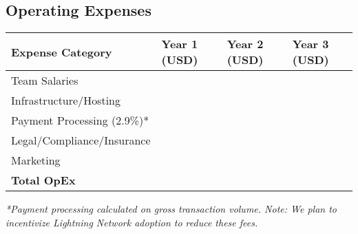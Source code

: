 \subsection{Operating Expenses}
\begin{table}[H]
\centering
\begin{tabularx}{\linewidth}{l Y Y Y}
\toprule
Expense Category & Year 1 (USD) & Year 2 (USD) & Year 3 (USD) \\\midrule
Team Salaries & \numint{\teamSalariesYearOne} & \numint{\teamSalariesYearTwo} & \numint{\teamSalariesYearThree} \\
Infrastructure/Hosting & \numint{\infrastructureYearOne} & \numint{\infrastructureYearTwo} & \numint{\infrastructureYearThree} \\
Payment Processing (2.9\%)* & \numint{\paymentCostsYearOne} & \numint{\paymentCostsYearTwo} & \numint{\paymentCostsYearThree} \\
Legal/Compliance/Insurance & \numint{\legalComplianceYearOne} & \numint{\legalComplianceYearTwo} & \numint{\legalComplianceYearThree} \\
Marketing & \numint{\marketingBudgetYearOne} & \numint{\marketingBudgetYearTwo} & \numint{\marketingBudgetYearThree} \\\midrule
\textbf{Total OpEx} & \textbf{\numint{\totalOpexYearOne + \marketingBudgetYearOne}} & \textbf{\numint{\totalOpexYearTwo + \marketingBudgetYearTwo}} & \textbf{\numint{\totalOpexYearThree + \marketingBudgetYearThree}} \\
\bottomrule
\end{tabularx}
\end{table}
\textit{*Payment processing calculated on gross transaction volume. Note: We plan to incentivize Lightning Network adoption to reduce these fees.}

